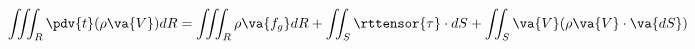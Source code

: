 \begin{equation}
  \iiint_R\pdv{t}(\rho\va{V})dR = \iiint_R\rho\va{f_g} dR + 
    \iint_S\rttensor{\tau}\cdot dS + \iint_S \va{V}(\rho\va{V}\cdot\va{dS})
\end{equation}
